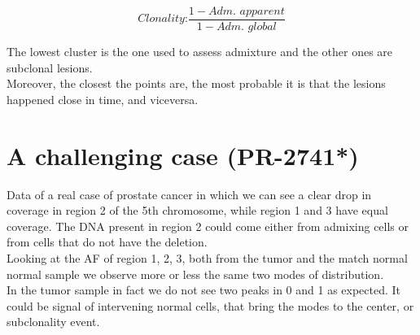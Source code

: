 \begin{equation}
\textit{Clonality:} \frac{1 - \textit{Adm. apparent}}{1 - \textit{Adm. global}}
\end{equation}

The lowest cluster is the one used to assess admixture and the other ones are subclonal lesions.\\
Moreover, the closest the points are, the most probable it is that the lesions happened close in time, and viceversa.

\section{A challenging case (PR-2741*)}
Data of a real case of prostate cancer in which we can see a clear drop in coverage in region 2 of the 5th chromosome, while region 1 and 3 have equal coverage. The DNA present in region 2 could come either from admixing cells or from cells that do not have the deletion. \\
Looking at the AF of region 1, 2, 3, both from the tumor and the match normal normal sample we observe more or less the same two modes of distribution.\\
In the tumor sample in fact we do not see two peaks in 0 and 1 as expected. It could be signal of intervening normal cells, that bring the modes to the center, or subclonality event. \\


